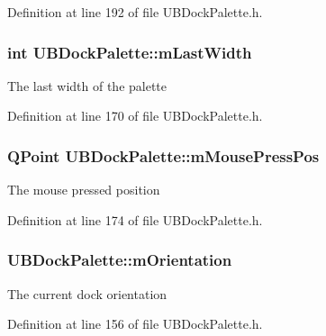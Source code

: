 Definition at line 192 of file U\-B\-Dock\-Palette.\-h.

\hypertarget{class_u_b_dock_palette_a4632ac43fa9b7f64df64ff263a5886ce}{
\subsubsection[{m\-Last\-Width}]{\setlength{\rightskip}{0pt plus 5cm}int U\-B\-Dock\-Palette\-::m\-Last\-Width\hspace{0.3cm}{\ttfamily [protected]}}}\label{dc/d54/class_u_b_dock_palette_a4632ac43fa9b7f64df64ff263a5886ce}
The last width of the palette 

Definition at line 170 of file U\-B\-Dock\-Palette.\-h.

\hypertarget{class_u_b_dock_palette_af1789f0531dcdeacfcb4128e48efbd74}{
\subsubsection[{m\-Mouse\-Press\-Pos}]{\setlength{\rightskip}{0pt plus 5cm}Q\-Point U\-B\-Dock\-Palette\-::m\-Mouse\-Press\-Pos\hspace{0.3cm}{\ttfamily [protected]}}}\label{dc/d54/class_u_b_dock_palette_af1789f0531dcdeacfcb4128e48efbd74}
The mouse pressed position 

Definition at line 174 of file U\-B\-Dock\-Palette.\-h.

\hypertarget{class_u_b_dock_palette_ae4ee6d66d55079cb8fc31fb5c890faf4}{
\subsubsection[{m\-Orientation}]{ U\-B\-Dock\-Palette\-::m\-Orientation\hspace{0.3cm}{\ttfamily [protected]}}}\label{dc/d54/class_u_b_dock_palette_ae4ee6d66d55079cb8fc31fb5c890faf4}
The current dock orientation 

Definition at line 156 of file U\-B\-Dock\-Palette.\-h.

